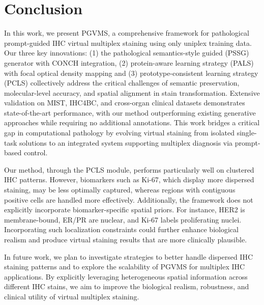 \documentclass[journal,twoside,web]{ieeecolor}
\newcommand{\revision}[1]{\textcolor{revisioncolor}{#1}}  %
\renewcommand{\revision}[1]{#1}%
\begin{document}
\section{Conclusion}
In this work, we present PGVMS, a comprehensive framework for pathological prompt-guided IHC virtual multiplex staining using only uniplex training data. Our three key innovations: (1) the pathological semantics-style guided  (PSSG) generator with CONCH integration, (2) protein-aware learning strategy (PALS) with focal optical density mapping and (3) prototype-consistent learning strategy (PCLS) collectively address the critical challenges of semantic preservation, molecular-level accuracy, and spatial alignment in stain transformation. \revision{Extensive validation on MIST, IHC4BC, and cross-organ clinical datasets demonstrates state-of-the-art performance, with our method outperforming existing generative approaches while requiring no additional annotations.} This work bridges a critical gap in computational pathology by evolving virtual staining from isolated single-task solutions to an integrated system supporting multiplex diagnosis via prompt-based control. 

{
Our method, through the PCLS module, performs particularly well on clustered IHC patterns. However, biomarkers such as Ki-67, which display more dispersed staining, may be less optimally captured, whereas regions with contiguous positive cells are handled more effectively. Additionally, the framework does not explicitly incorporate biomarker-specific spatial priors. For instance, HER2 is membrane-bound, ER/PR are nuclear, and Ki-67 labels proliferating nuclei. Incorporating such localization constraints could further enhance biological realism and produce virtual staining results that are more clinically plausible.
}

{
In future work, we plan to investigate strategies to better handle dispersed IHC staining patterns and to explore the scalability of PGVMS for multiplex IHC applications. By explicitly leveraging heterogeneous spatial information across different IHC stains, we aim to improve the biological realism, robustness, and clinical utility of virtual multiplex staining.
}
\end{document}
